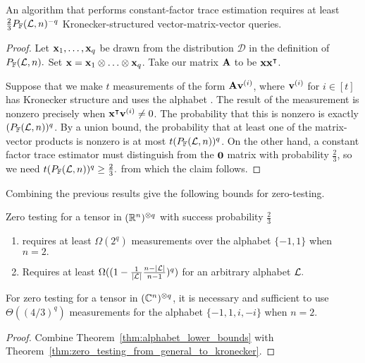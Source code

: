 \iffalse
Let $\mathcal{U}$ and $\mathcal{V}$ be two collections of vectors in $\mathcal{C}^N.$  Define 
\[
p(\mathcal{U}, \mathcal{V}) = \max_{\mathcal{D}_{\mathcal{U}}} \min_{\mathcal{D}_{\mathcal{V}}} \Pr_{u \sim \mathcal{D}_{\mathcal{U}}, v \sim \mathcal{D}_{\mathcal{V}}} u^\intercal v \neq 0.
\]
Intuitively $\mathcal{D}_{\mathcal{V}}$ represent the worst 

\begin{lemma}

\end{lemma}
\fi


\begin{lemma}
\label{lem:from_zero_testing_to_trace_estimation}
An algorithm that performs constant-factor trace estimation requires at least $\frac{2}{3} P_{\mathbb{F}}({\mathcal L}, n)^{-q}$
Kronecker-structured vector-matrix-vector queries.
\end{lemma}
\begin{proof}
Let $\boldsymbol{\mathrm{x}}_1, \ldots, \boldsymbol{\mathrm{x}}_q$ be drawn from the distribution $\mathcal{D}$ in the definition of $P_{\mathbb{F}}({\mathcal L}, n).$
Set $\boldsymbol{\mathrm{x}} = \boldsymbol{\mathrm{x}}_1 \otimes \ldots \otimes \boldsymbol{\mathrm{x}}_q$.
Take our matrix $\mathbf{A}$ to be $\boldsymbol{\mathrm{x}}\boldsymbol{\mathrm{x}}^\intercal$.

Suppose that we make \(t\) measurements of the form \(\mathbf{A}\boldsymbol{\mathrm{v}}^{(i)}\), where \(\boldsymbol{\mathrm{v}}^{(i)}\) for \(i\in[t]\) has Kronecker structure and uses the alphabet \alphabet.
The result of the measurement is nonzero precisely when \(\boldsymbol{\mathrm{x}}^\intercal\boldsymbol{\mathrm{v}}^{(i)} \neq 0\).
The probability that this is nonzero is exactly \((P_{{\mathbb F}}({\mathcal L},n))^q\).
By a union bound, the probability that at least one of the matrix-vector products is nonzero is at most \(t (P_{{\mathbb F}}({\mathcal L},n))^q\).
On the other hand, a constant factor trace estimator must distinguish \mA from the \(\mathbf{0}\) matrix with probability \(\frac23\), so we need $t (P_{{\mathbb F}}({\mathcal L}, n))^q \geq {\textstyle\frac{2}{3}}.$
from which the claim follows.
\end{proof}

Combining the previous results give the following bounds for zero-testing.

\begin{corollary}
\label{cor:zero_testing_lower_bound_special_cases}
Zero testing for a tensor in $(\mathbb{R}^n)^{\otimes q}$ with success probability $\frac23$
\begin{enumerate}
\item requires at least $\Omega(2^q)$ measurements over the alphabet $\{-1,1\}$ when $n=2.$
\item Requires at least $\Omega((1 - \frac{1}{\vert{\ensuremath{{\mathcal L}}}\vert} \frac{n-\vert{\ensuremath{{\mathcal L}}}\vert}{n-1})^q)$ for an arbitrary alphabet ${\mathcal L}.$
\end{enumerate}
For zero testing for a tensor in \(({\mathbb C}^{n})^{\otimes q}\), it is necessary and sufficient to use $\Theta ((4/3)^q)$ measurements for the alphabet $\{-1, 1, i, -i\}$ when $n=2$.
\end{corollary}
\begin{proof}
Combine Theorem~\ref{thm:alphabet_lower_bounds} with Theorem~\ref{thm:zero_testing_from_general_to_kronecker}.
\end{proof}



